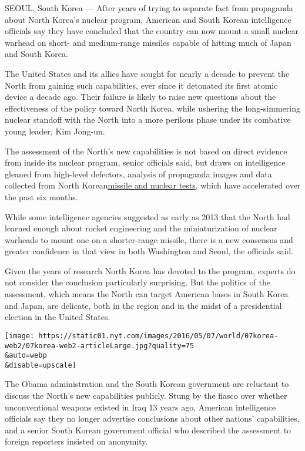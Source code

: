 SEOUL, South Korea --- After years of trying to separate fact from
propaganda about North Korea's nuclear program, American and South
Korean intelligence officials say they have concluded that the country
can now mount a small nuclear warhead on short- and medium-range
missiles capable of hitting much of Japan and South Korea.

The United States and its allies have sought for nearly a decade to
prevent the North from gaining such capabilities, ever since it
detonated its first atomic device a decade ago. Their failure is likely
to raise new questions about the effectiveness of the policy toward
North Korea, while ushering the long-simmering nuclear standoff with the
North into a more perilous phase under its combative young leader, Kim
Jong-un.

The assessment of the North's new capabilities is not based on direct
evidence from inside its nuclear program, senior officials said, but
draws on intelligence gleaned from high-level defectors, analysis of
propaganda images and data collected from North
Korean\href{http://www.nytimes.com/topic/subject/north-koreas-nuclear-program?8qa}{missile
and nuclear tests}, which have accelerated over the past six months.

While some intelligence agencies suggested as early as 2013 that the
North had learned enough about rocket engineering and the
miniaturization of nuclear warheads to mount one on a shorter-range
missile, there is a new consensus and greater confidence in that view in
both Washington and Seoul, the officials said.

Given the years of research North Korea has devoted to the program,
experts do not consider the conclusion particularly surprising. But the
politics of the assessment, which means the North can target American
bases in South Korea and Japan, are delicate, both in the region and in
the midst of a presidential election in the United States.

\texttt{[image: https://static01.nyt.com/images/2016/05/07/world/07korea-web2/07korea-web2-articleLarge.jpg?quality=75\\\&auto=webp\\\&disable=upscale]}

The Obama administration and the South Korean government are reluctant
to discuss the North's new capabilities publicly. Stung by the fiasco
over whether unconventional weapons existed in Iraq 13 years ago,
American intelligence officials say they no longer advertise conclusions
about other nations' capabilities, and a senior South Korean government
official who described the assessment to foreign reporters insisted on
anonymity.

